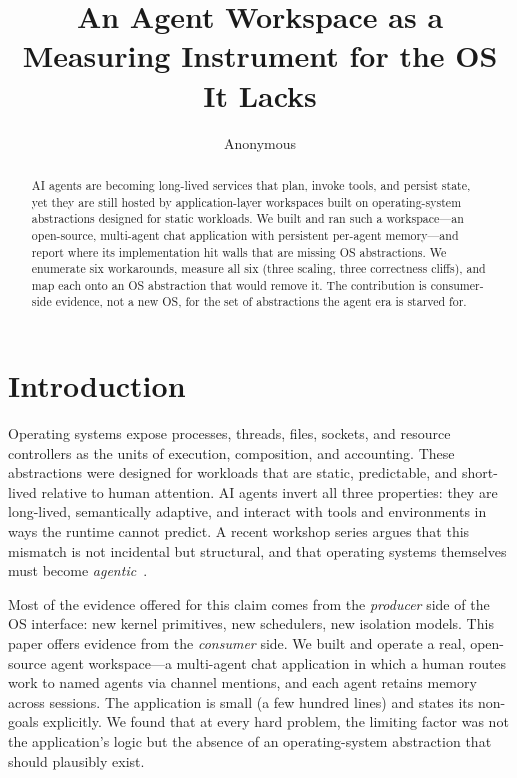 \documentclass[sigconf, review, anonymous]{acmart}
\begin{document}
\title{An Agent Workspace as a Measuring Instrument for the OS It Lacks}

\author{Anonymous}

\begin{abstract}
AI agents are becoming long-lived services that plan, invoke tools, and
persist state, yet they are still hosted by application-layer workspaces
built on operating-system abstractions designed for static workloads. We
built and ran such a workspace---an open-source, multi-agent chat
application with persistent per-agent memory---and report where its
implementation hit walls that are missing OS abstractions. We enumerate
six workarounds, measure all six (three scaling, three correctness cliffs),
and map each onto an OS abstraction that would remove it. The contribution
is consumer-side evidence, not a new OS, for the set of abstractions the
agent era is starved for.
\end{abstract}

\maketitle

\section{Introduction}

Operating systems expose processes, threads, files, sockets, and resource
controllers as the units of execution, composition, and accounting. These
abstractions were designed for workloads that are static, predictable, and
short-lived relative to human attention. AI agents invert all three
properties: they are long-lived, semantically adaptive, and interact with
tools and environments in ways the runtime cannot predict. A recent workshop
series argues that this mismatch is not incidental but structural, and that
operating systems themselves must become \emph{agentic}~\cite{agenticos}.

Most of the evidence offered for this claim comes from the
\emph{producer} side of the OS interface: new kernel primitives, new
schedulers, new isolation models. This paper offers evidence from the
\emph{consumer} side. We built and operate a real, open-source agent
workspace---a multi-agent chat application in which a human routes work to
named agents via channel mentions, and each agent retains memory across
sessions. The application is small (a few hundred lines) and states its
non-goals explicitly. We found that at every hard problem, the limiting
factor was not the application's logic but the absence of an
operating-system abstraction that should plausibly exist.
\end{document}
